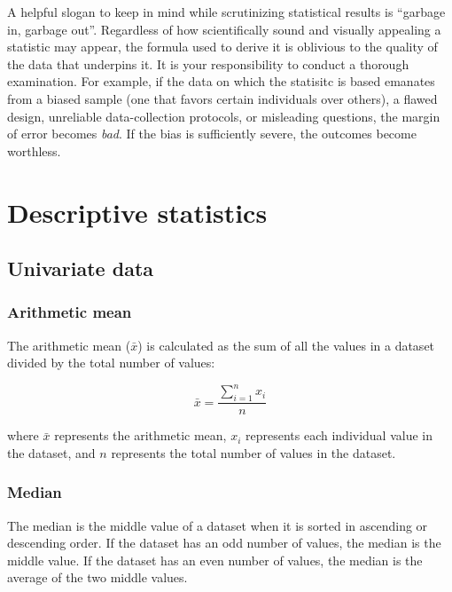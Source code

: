 \documentclass[
  12pt,
  oneside]{book}
\theoremstyle{definition}
\theoremstyle{definition}
\theoremstyle{definition}
\theoremstyle{definition}
\theoremstyle{remark}
\begin{document}
A helpful slogan to keep in mind while scrutinizing statistical results is ``garbage in, garbage out''. Regardless of how scientifically sound and visually appealing a statistic may appear, the formula used to derive it is oblivious to the quality of the data that underpins it. It is your responsibility to conduct a thorough examination. For example, if the data on which the statisitc is based emanates from a biased sample (one that favors certain individuals over others), a flawed design, unreliable data-collection protocols, or misleading questions, the margin of error becomes \emph{bad}. If the bias is sufficiently severe, the outcomes become worthless.

\hypertarget{descriptive-statistics}{%
\section{Descriptive statistics}\label{descriptive-statistics}}

\hypertarget{univariate-data}{%
\subsection{Univariate data}\label{univariate-data}}

\hypertarget{arithmetic-mean}{%
\subsubsection{Arithmetic mean}\label{arithmetic-mean}}

The arithmetic mean (\(\bar{x}\)) is calculated as the sum of all the values in a dataset divided by the total number of values:

\[
\bar{x} = \frac{{\sum_{i=1}^{n} x_i}}{n}
\]

where \(\bar{x}\) represents the arithmetic mean, \(x_i\) represents each individual value in the dataset, and \(n\) represents the total number of values in the dataset.

\hypertarget{median}{%
\subsubsection{Median}\label{median}}

The median is the middle value of a dataset when it is sorted in ascending or descending order. If the dataset has an odd number of values, the median is the middle value. If the dataset has an even number of values, the median is the average of the two middle values.
\end{document}
